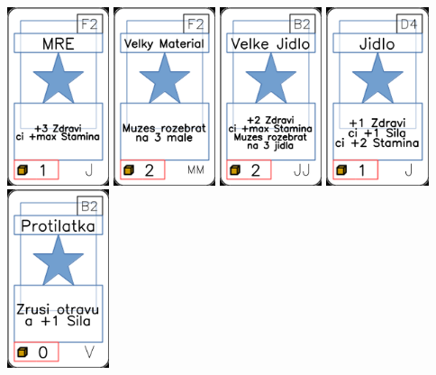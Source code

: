 \documentclass[a4paper]{article}
\begin{document}
	\includegraphics[width=3.0cm]{img-1_26}
	\includegraphics[width=3.0cm]{img-1_56}
	\includegraphics[width=3.0cm]{img-1_36}
	\includegraphics[width=3.0cm]{img-1_18}
	\includegraphics[width=3.0cm]{img-1_66}
\end{document}
